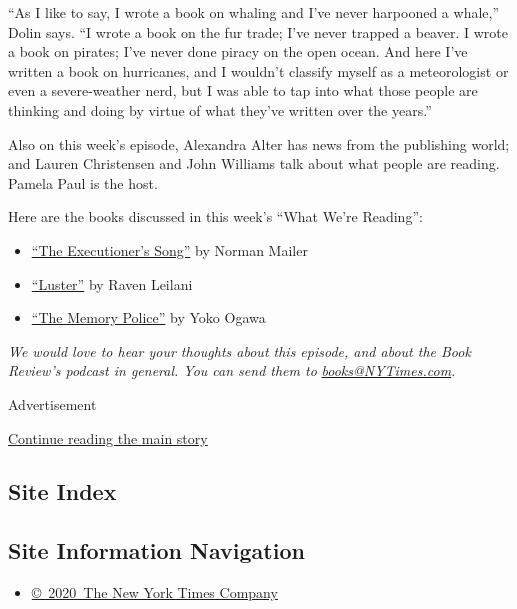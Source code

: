 ``As I like to say, I wrote a book on whaling and I've never harpooned a
whale,'' Dolin says. ``I wrote a book on the fur trade; I've never
trapped a beaver. I wrote a book on pirates; I've never done piracy on
the open ocean. And here I've written a book on hurricanes, and I
wouldn't classify myself as a meteorologist or even a severe-weather
nerd, but I was able to tap into what those people are thinking and
doing by virtue of what they've written over the years.''

Also on this week's episode, Alexandra Alter has news from the
publishing world; and Lauren Christensen and John Williams talk about
what people are reading. Pamela Paul is the host.

Here are the books discussed in this week's ``What We're Reading'':

\begin{itemize}
\item
  \href{http://movies2.nytimes3xbfgragh.onion/books/97/05/04/reviews/mailer-song.html}{``The
  Executioner's Song''} by Norman Mailer
\item
  \href{https://www.nytimes3xbfgragh.onion/2020/08/06/books/review/raven-leilani-luster.html}{``Luster''}
  by Raven Leilani
\item
  \href{https://www.nytimes3xbfgragh.onion/2019/08/12/books/yoko-ogawa-memory-police.html}{``The
  Memory Police''} by Yoko Ogawa
\end{itemize}

\emph{We would love to hear your thoughts about this episode, and about
the Book Review's podcast in general. You can send them to}
\href{mailto:books@NYTimes.com}{\emph{books@NYTimes.com}}\emph{.}

Advertisement

\protect\hyperlink{after-bottom}{Continue reading the main story}

\hypertarget{site-index}{%
\subsection{Site Index}\label{site-index}}

\hypertarget{site-information-navigation}{%
\subsection{Site Information
Navigation}\label{site-information-navigation}}

\begin{itemize}
\tightlist
\item
  \href{https://help.nytimes3xbfgragh.onion/hc/en-us/articles/115014792127-Copyright-notice}{©~2020~The
  New York Times Company}
\end{itemize}

